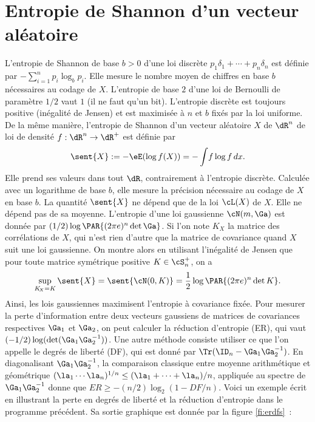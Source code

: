 \section{Entropie de Shannon d'un vecteur aléatoire}
%
L'entropie de Shannon de base $b>0$ d'une loi discrète $p_1\delta_1+\cdots+
p_n\delta_n$ est définie par $-\sum_{i=1}^n p_i\log_b p_i$.  Elle mesure le
nombre moyen de chiffres en base $b$ nécessaires au codage de $X$. L'entropie
de base $2$ d'une loi de Bernoulli de paramètre $1/2$ vaut $1$ (il ne faut
qu'un bit). L'entropie discrète est toujours positive (inégalité de Jensen) et
est maximisée à $n$ et $b$ fixés par la loi uniforme.  De la même manière,
l'entropie de Shannon d'un vecteur aléatoire $X$ de $\dR^n$ de loi de densité
$f:\dR^n\to\dR^+$ est définie par
$$
\sent{X}:=-\eE(\log f(X))=-\int\!f\log f\,dx.
$$
Elle prend ses valeurs dans tout $\dR$, contrairement à l'entropie
discrète.  Calculée avec un logarithme de base $b$, elle mesure la précision
nécessaire au codage de $X$ en base $b$. La quantité $\sent{X}$ ne dépend que
de la loi $\cL(X)$ de $X$. Elle ne dépend pas de sa moyenne. L'entropie d'une
loi gaussienne $\cN(m,\Ga)$ est donnée par $(1/2) \log \PAR{(2\pi e)^n\det
  \Ga}$.  Si l'on note $K_{\!X}$ la matrice des corrélations de $X$, qui n'est
rien d'autre que la matrice de covariance quand $X$ suit une loi gaussienne.
On montre alors en utilisant l'inégalité de Jensen que pour toute matrice
symétrique positive $K\in\cS_n^+$, on a
$$
\sup_{K_{\!X}=K}\sent{X} = \sent{\cN(0,K)} = \frac{1}{2} \log \PAR{(2\pi
  e)^n\det K}.
$$
Ainsi, les lois gaussiennes maximisent l'entropie à covariance fixée. Pour
mesurer la perte d'information entre deux vecteurs gaussiens de matrices de
covariances respectives $\Ga_1$ et $\Ga_2$, on peut calculer la réduction
d'entropie (ER), qui vaut $(-1/2)\log(\det(\Ga_1\Ga_2^{-1}))$. Une autre
méthode consiste utiliser ce que l'on appelle le degrés de liberté (DF), qui
est donné par $\Tr(\ID_n-\Ga_1\Ga_2^{-1})$. En diagonalisant
$\Ga_1\Ga_2^{-1}$, la comparaison classique entre moyenne arithmétique et
géométrique $(\la_1\cdots\la_n)^{1/n} \leq (\la_1+\cdots+\la_n)/n$, appliquée au spectre de
$\Ga_1\Ga_2^{-1}$ donne que $ER\geq -(n/2)\log_2(1-DF/n)$. Voici un exemple écrit
en \ML{} illustrant la perte en degrés de liberté et la réduction d'entropie
dans le programme précédent. Sa sortie graphique est donnée par la figure
\ref{fi:erdfs}~:
%
%
%
%

